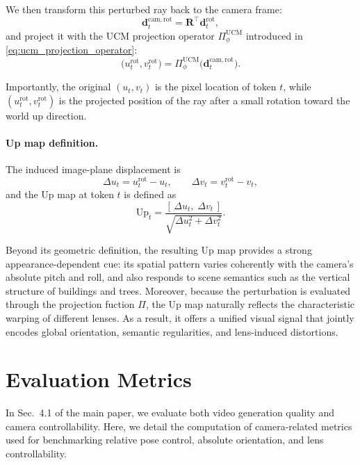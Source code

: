 We then transform this perturbed ray back to the camera frame:
\begin{equation}
\bm{d}^{\mathrm{cam,rot}}_t = \mathbf{R}^\top \bm{d}^{\mathrm{rot}}_t,
\end{equation}
and project it with the UCM projection operator
\(\Pi^{\mathrm{UCM}}_{\phi}\) introduced in \cref{eq:ucm_projection_operator}:
\begin{equation}
\big(u^{\mathrm{rot}}_t, v^{\mathrm{rot}}_t\big)
=
\Pi^{\mathrm{UCM}}_{\phi}\!\big(\bm{d}^{\mathrm{cam,rot}}_t\big).
\end{equation}

Importantly, the original \((u_t, v_t)\) is the pixel location of token \(t\),
while \((u^{\mathrm{rot}}_t, v^{\mathrm{rot}}_t)\) is the projected position of
the ray after a small rotation toward the world up direction.

\paragraph{Up map definition.}
The induced image-plane displacement is
\begin{equation}
\Delta u_t = u^{\mathrm{rot}}_t - u_t,
\qquad
\Delta v_t = v^{\mathrm{rot}}_t - v_t,
\end{equation}
and the Up map at token \(t\) is defined as
\begin{equation}
\mathrm{Up}_t
=
\frac{
\left[\,\Delta u_t,\;\Delta v_t\,\right]
}{
\sqrt{\Delta u_t^2 + \Delta v_t^2}
}.
\label{eq:up_final_suppl}
\end{equation}

Beyond its geometric definition, the resulting Up map provides a strong appearance-dependent cue: its spatial pattern varies coherently with the camera's absolute pitch and roll, and also responds to scene semantics such as the vertical structure of buildings and trees.
Moreover, because the perturbation is evaluated through the projection fuction \(\Pi\), the Up map naturally reflects the characteristic warping of different lenses.
As a result, it offers a unified visual signal that jointly encodes global orientation, semantic regularities, and lens-induced distortions.




\section{Evaluation Metrics}
\label{sec:eval}

In Sec.~4.1 of the main paper, we evaluate both video generation quality and
camera controllability.  
Here, we detail the computation of camera-related metrics used for benchmarking
relative pose control, absolute orientation, and lens controllability.

